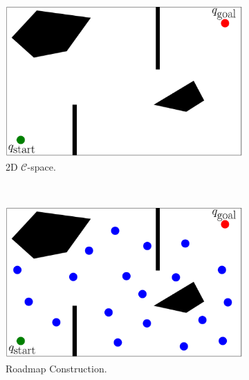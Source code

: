 \documentclass{ctuthesis}
\begin{document}
\begin{figure}[!ht]
  \centering
  \begin{subfigure}[b]{0.45\textwidth}
      \includegraphics[width=\textwidth]{figChap3/PRMmaze40pt.pdf}
      \caption{2D $\mathcal{C}$-space.}
      \label{fig:prm_maze}
  \end{subfigure}
  ~ %
  \begin{subfigure}[b]{0.45\textwidth}
      \includegraphics[width=\textwidth]{figChap3/PRMsamplePoints40pt.pdf} 
      \caption{Roadmap Construction.}
      \label{fig:random_points}
  \end{subfigure}
  ~ %
  \begin{subfigure}[b]{0.45\textwidth}

\end{subfigure}
\end{figure}
\end{document}
